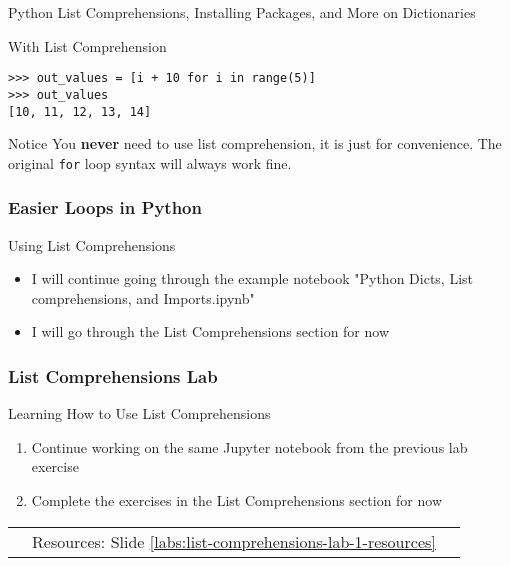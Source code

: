 \documentclass[handout, 11pt]{beamer}
\begin{document}
\begin{section}{Python List Comprehensions, Installing Packages, and More on Dictionaries}
\begin{frame}[fragile]
\begin{block}{With List Comprehension}
\begin{verbatim}
>>> out_values = [i + 10 for i in range(5)]
>>> out_values
[10, 11, 12, 13, 14]

\end{verbatim}
\end{block}
\begin{block}{Notice}
You
\textbf{never}
need to use list comprehension, it is just for convenience. The original
\texttt{for}
loop syntax will always work fine.
\end{block}
\end{frame}
\begin{frame}
\frametitle{Easier Loops in Python}
{
\begin{block}{Using List Comprehensions}
\begin{itemize}
\item I will continue going through the example notebook "Python Dicts, List comprehensions, and Imports.ipynb"
\item I will go through the List Comprehensions section for now
\end{itemize}
\end{block}
}
\end{frame}
\begin{frame}
\frametitle{List Comprehensions Lab}
{
\begin{block}{Learning How to Use List Comprehensions}
\begin{enumerate}
\item Continue working on the same Jupyter notebook from the previous lab exercise
\item Complete the exercises in the List Comprehensions section for now
\end{enumerate}
\vfill
\begin{tabular*}{\textwidth}{@{\extracolsep{\fill}}ccc}
\toprule
\hfill & Resources: Slide \textcolor{blue}{\underline{\ref{labs:list-comprehensions-lab-1-resources}}} & \hfill\\


\end{tabular*}
\end{block}}
\end{frame}
\end{section}
\end{document}

